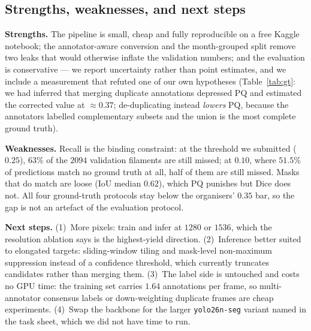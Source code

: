 \documentclass[sigconf]{acmart}
\begin{document}
\subsection{Strengths, weaknesses, and next steps}
\textbf{Strengths.} The pipeline is small, cheap and fully reproducible on a free Kaggle notebook; the annotator-aware conversion and the month-grouped split remove two leaks that would otherwise inflate the validation numbers; and the evaluation is conservative --- we report uncertainty rather than point estimates, and we include a measurement that refuted one of our own hypotheses (Table~\ref{tab:gt}: we had inferred that merging duplicate annotations depressed PQ and estimated the corrected value at $\approx\!0.37$; de-duplicating instead \emph{lowers} PQ, because the annotators labelled complementary subsets and the union is the most complete ground truth).

\textbf{Weaknesses.} Recall is the binding constraint: at the threshold we submitted ($0.25$), $63\%$ of the $2094$ validation filaments are still missed; at $0.10$, where $51.5\%$ of predictions match no ground truth at all, half of them are still missed. Masks that do match are loose (IoU median $0.62$), which PQ punishes but Dice does not. All four ground-truth protocols stay below the organisers' $0.35$ bar, so the gap is not an artefact of the evaluation protocol.

\textbf{Next steps.} (1)~More pixels: train and infer at $1280$ or $1536$, which the resolution ablation says is the highest-yield direction. (2)~Inference better suited to elongated targets: sliding-window tiling and mask-level non-maximum suppression instead of a confidence threshold, which currently truncates candidates rather than merging them. (3)~The label side is untouched and costs no GPU time: the training set carries $1.64$ annotations per frame, so multi-annotator consensus labels or down-weighting duplicate frames are cheap experiments. (4)~Swap the backbone for the larger \texttt{yolo26n-seg} variant named in the task sheet, which we did not have time to run.

\end{document}
